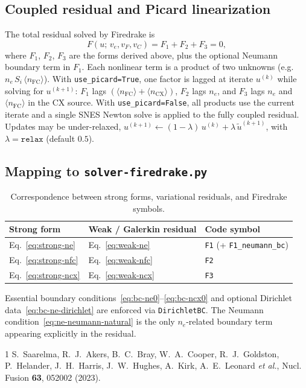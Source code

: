 \subsection{Coupled residual and Picard linearization}
\label{sec:coupled}

The total residual solved by Firedrake is
\begin{equation}
  F(u;\,v_e,v_F,v_C) = F_1 + F_2 + F_3 = 0,
  \label{eq:total-F}
\end{equation}
where $F_1$, $F_2$, $F_3$ are the forms derived above, plus the optional
Neumann boundary term in $F_1$.
Each nonlinear term is a product of two unknowns
(e.g.\ $n_e\,S_i\,\langle n_{\mathrm{FC}}\rangle$).
With \texttt{use\_picard=True}, one factor is lagged at iterate $u^{(k)}$
while solving for $u^{(k+1)}$:
$F_1$ lags $(\langle n_{\mathrm{FC}}\rangle+\langle n_{\mathrm{CX}}\rangle)$,
$F_2$ lags $n_e$, and $F_3$ lags $n_e$ and $\langle n_{\mathrm{FC}}\rangle$
in the CX source.
With \texttt{use\_picard=False}, all products use the current iterate and a
single SNES Newton solve is applied to the fully coupled residual.
Updates may be under-relaxed,
$u^{(k+1)} \leftarrow (1-\lambda)\,u^{(k)} + \lambda\,\tilde u^{(k+1)}$,
with $\lambda=\texttt{relax}$ (default $0.5$).

\subsection{Mapping to \texorpdfstring{\texttt{solver-firedrake.py}}{solver-firedrake.py}}
\label{sec:code-map}

\begin{table}[t]
\caption{\label{tab:code-map}Correspondence between strong forms, variational residuals, and Firedrake symbols.}
\begin{ruledtabular}
\begin{tabular}{lll}
Strong form & Weak / Galerkin residual & Code symbol \\
\hline
Eq.~\eqref{eq:strong-ne} & Eq.~\eqref{eq:weak-ne} & \texttt{F1} (+ \texttt{F1\_neumann\_bc}) \\
Eq.~\eqref{eq:strong-nfc} & Eq.~\eqref{eq:weak-nfc} & \texttt{F2} \\
Eq.~\eqref{eq:strong-ncx} & Eq.~\eqref{eq:weak-ncx} & \texttt{F3} \\
\end{tabular}
\end{ruledtabular}
\end{table}

Essential boundary conditions~\eqref{eq:bc-ne0}--\eqref{eq:bc-ncx0} and
optional Dirichlet data~\eqref{eq:bc-ne-dirichlet} are enforced via
\texttt{DirichletBC}.
The Neumann condition~\eqref{eq:ne-neumann-natural} is the only
$n_e$-related boundary term appearing explicitly in the residual.

\begin{thebibliography}{1}
S.~Saarelma, R.~J.~Akers, B.~C.~Bray, W.~A.~Cooper, R.~J.~Goldston, P.~Helander, J.~H.~Harris, J.~W.~Hughes, A.~Kirk, A.~E.~Leonard \emph{et al.},
Nucl. Fusion \textbf{63}, 052002 (2023).
\end{thebibliography}


